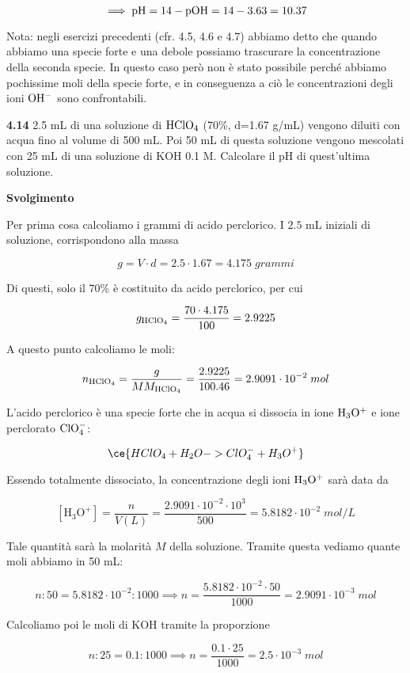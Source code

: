 $$\implies \rm pH=14-pOH=14-3.63=10.37$$

Nota: negli esercizi precedenti (cfr. 4.5, 4.6 e 4.7) abbiamo detto che quando abbiamo una specie forte e una debole possiamo trascurare la concentrazione della seconda specie. In questo caso però non è stato possibile perché abbiamo pochissime moli della specie forte, e in conseguenza a ciò le concentrazioni degli ioni $\rm OH^-$ sono confrontabili.

\vspace{0.2cm}\textbf{4.14} 2.5 mL di una soluzione di $\rm HClO_4$ (70\%, d=1.67 g/mL) vengono diluiti con acqua fino al
volume di 500 mL. Poi 50 mL di questa soluzione vengono mescolati con 25 mL di una soluzione di KOH 0.1 M. Calcolare il pH di quest'ultima soluzione.

\vspace{0.2cm}\large\textbf{Svolgimento}\normalsize

\vspace{0.2cm}Per prima cosa calcoliamo i grammi di acido perclorico. I $2.5$ mL iniziali di soluzione, corrispondono alla massa

$$g=V \cdot d=2.5 \cdot 1.67=4.175\;grammi$$

Di questi, solo il 70\% è costituito da acido perclorico, per cui

$$g_{\rm HClO_4}=\frac{70 \cdot 4.175}{100}=2.9225$$

A questo punto calcoliamo le moli:

$$n_{\rm HClO_4}
=\frac{g}{MM_{\rm HClO_4}}
=\frac{2.9225}{100.46}=2.9091 \cdot 10^{-2}\;mol$$

L'acido perclorico è una specie forte che in acqua si dissocia in ione $\rm H_3O^+$ e ione perclorato $\rm ClO_4^-$:

$$\ce{HClO_4 + H_2O -> ClO_4^- + H_3O^+}$$

Essendo totalmente dissociato, la concentrazione degli ioni $\rm H_3O^+$ sarà data da

$$[\text{H}_3\text{O}^+]=\frac{n}{V(L)}=\frac{2.9091 \cdot 10^{-2} \cdot 10^{3}}{500}=5.8182 \cdot 10^{-2}\;mol/L$$

Tale quantità sarà la molarità $M$ della soluzione. Tramite questa vediamo quante moli abbiamo in 50 mL:

$$n:50=5.8182 \cdot 10^{-2}:1000
\implies
n=\frac{5.8182 \cdot 10^{-2} \cdot 50}{1000}
=2.9091 \cdot 10^{-3}\;mol$$

Calcoliamo poi le moli di KOH tramite la proporzione

$$n:25=0.1:1000
\implies
n=\frac{0.1 \cdot 25}{1000}
=2.5 \cdot 10^{-3}\;mol$$

